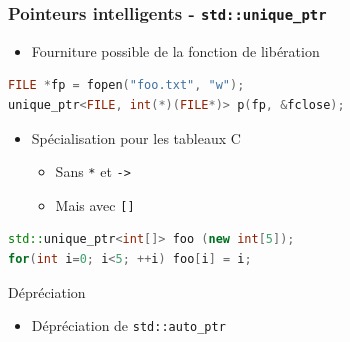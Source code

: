 \documentclass[C++.tex]{subfiles}
\begin{document}
\begin{frame}[fragile]
	\frametitle{Pointeurs intelligents - \lstinline|std::unique_ptr|}
	\begin{itemize}
		\item Fourniture possible de la fonction de libération
	\end{itemize}

	\begin{lstlisting}[language=C++]
FILE *fp = fopen("foo.txt", "w");
unique_ptr<FILE, int(*)(FILE*)> p(fp, &fclose);\end{lstlisting}


	\begin{itemize}
		\item Spécialisation pour les tableaux C
		\begin{itemize}
			\item Sans \lstinline|*| et \lstinline|->|
			\item Mais avec \lstinline|[]|
		\end{itemize}
	\end{itemize}

	\begin{lstlisting}[language=C++]
std::unique_ptr<int[]> foo (new int[5]);
for(int i=0; i<5; ++i) foo[i] = i;\end{lstlisting}

	\begin{block}{Dépréciation}
		\begin{itemize}
			\item Dépréciation de \lstinline|std::auto_ptr|
		\end{itemize}
	\end{block}
\end{frame}
\end{document}
